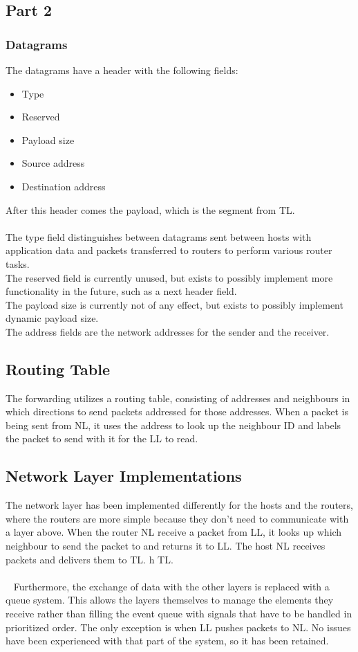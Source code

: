 \subsection{Part 2}
\subsubsection{Datagrams}
\label{sec:DATAGRAM}
The datagrams have a header with the following fields:
\begin{itemize}
\item Type
\item Reserved
\item Payload size
\item Source address
\item Destination address
\end{itemize}

After this header comes the payload, which is the segment from TL.\\
\\
The type field distinguishes between datagrams sent between hosts with application data and packets transferred to routers to perform various router tasks.\\
The reserved field is currently unused, but exists to possibly implement more functionality in the future, such as a next header field.\\
The payload size is currently not of any effect, but exists to possibly implement dynamic payload size.\\
The address fields are the network addresses for the sender and the receiver.

\subsection{Routing Table}
The forwarding utilizes a routing table, consisting of addresses and neighbours in which directions to send packets addressed for those addresses. When a packet is being sent from NL, it uses the address to look up the neighbour ID and labels the packet to send with it for the LL to read.

\subsection{Network Layer Implementations}
The network layer has been implemented differently for the hosts and the routers, where the routers are more simple because they don't need to communicate with a layer above. When the router NL receive a packet from LL, it looks up which neighbour to send the packet to and returns it to LL. The host NL receives packets and delivers them to TL.
h TL.\\
\\~
Furthermore, the exchange of data with the other layers is replaced with a queue system. This allows the layers themselves to manage the elements they receive rather than filling the event queue with signals that have to be handled in prioritized order. The only exception is when LL pushes packets to NL. No issues have been experienced with that part of the system, so it has been retained.

